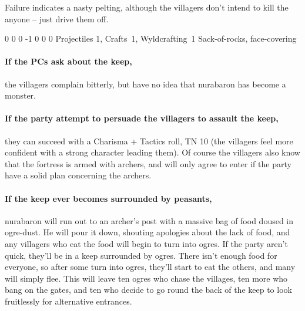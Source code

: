 \begin{multicols}{2}
Failure indicates a nasty pelting, although the villagers don't intend to kill the anyone -- just drive them off.

{0}%
{0}%
{{0}%
{-1}%
{0}}%
{0}%
{0}%
{Projectiles 1, Crafts~1, Wyldcrafting~1}%
{Sack-of-rocks, face-covering}%
{}

\paragraph{If the PCs ask about the keep,}
the villagers complain bitterly, but have no idea that \gls{nurabaron} has become a monster.

\paragraph{If the party attempt to persuade the villagers to assault the keep,}
they can succeed with a Charisma + Tactics roll, TN 10
(the villagers feel more confident with a strong character leading them).
Of course the villagers also know that the fortress is armed with archers, and will only agree to enter if the party have a solid plan concerning the archers.

\paragraph{If the keep ever becomes surrounded by peasants,}
\gls{nurabaron} will run out to an archer's post with a massive bag of food doused in ogre-dust.
He will pour it down, shouting apologies about the lack of food, and any villagers who eat the food will begin to turn into ogres.
If the party aren't quick, they'll be in a keep surrounded by ogres.
There isn't enough food for everyone, so after some turn into ogres, they'll start to eat the others, and many will simply flee.
This will leave ten ogres who chase the villages, ten more who bang on the gates, and ten who decide to go round the back of the keep to look fruitlessly for alternative entrances.



\end{multicols}

